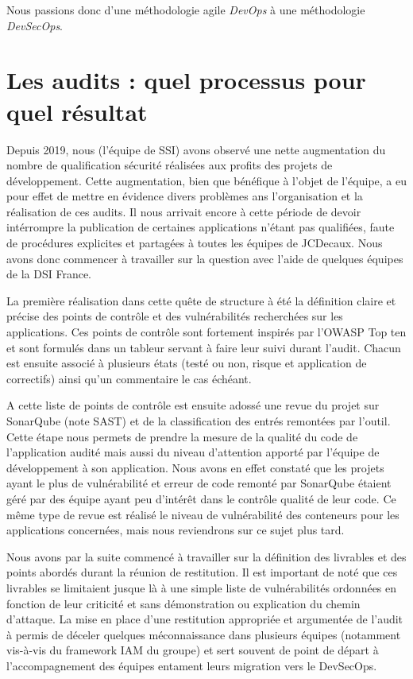 Nous passions donc d'une méthodologie agile \emph{DevOps} à une méthodologie \emph{DevSecOps}.

\newpage

\section{Les audits : quel processus pour quel résultat}
Depuis 2019, nous (l'équipe de \ac{SSI}) avons observé une nette augmentation du nombre de qualification sécurité réalisées
aux profits des projets de développement. Cette augmentation, bien que bénéfique à l'objet de l'équipe, a eu pour effet 
de mettre en évidence divers problèmes ans l'organisation et la réalisation de ces audits.
\newline Il nous arrivait encore à cette période de devoir intérrompre la publication de certaines applications n'étant 
pas qualifiées, faute de procédures explicites et partagées à toutes les équipes de JCDecaux. Nous avons donc commencer à 
travailler sur la question avec l'aide de quelques équipes de la \ac{DSI} France.

La première réalisation dans cette quête de structure à été la définition claire et précise des points de contrôle et 
des vulnérabilités recherchées sur les applications. Ces points de contrôle sont fortement inspirés par l'OWASP Top ten
\autocite{owasp_top10_2017} et sont formulés dans un tableur servant à faire leur suivi durant l'audit. Chacun est 
ensuite associé à plusieurs états (testé ou non, risque et application de correctifs) ainsi qu'un commentaire le cas 
échéant.

A cette liste de points de contrôle est ensuite adossé une revue du projet sur SonarQube (note \ac{SAST}) et de la 
classification des entrés remontées par l'outil. Cette étape nous permets de prendre la mesure de la qualité du code de 
l'application audité mais aussi du niveau d'attention apporté par l'équipe de développement à son application.
\newline Nous avons en effet constaté que les projets ayant le plus de vulnérabilité et erreur de code remonté par 
SonarQube étaient géré par des équipe ayant peu d'intérêt dans le contrôle qualité de leur code.
\newline Ce même type de revue est réalisé le niveau de vulnérabilité des conteneurs pour les applications concernées, 
mais nous reviendrons sur ce sujet plus tard.

Nous avons par la suite commencé à travailler sur la définition des livrables et des points abordés durant la réunion de
restitution. Il est important de noté que ces livrables se limitaient jusque là à une simple liste de vulnérabilités
ordonnées en fonction de leur criticité et sans démonstration ou explication du chemin d'attaque.
\newline  La mise en place d'une restitution appropriée et argumentée de l'audit à permis de déceler quelques 
méconnaissance dans plusieurs équipes (notamment vis-à-vis du framework IAM du groupe) et sert souvent de point de départ 
à l'accompagnement des équipes entament leurs migration vers le DevSecOps.

